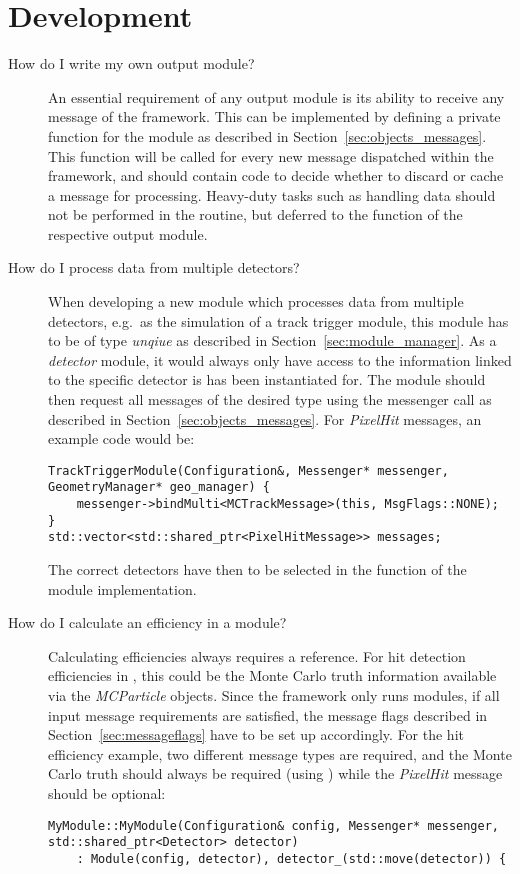 \section{Development}
\begin{description}
\item[How do I write my own output module?]
An essential requirement of any output module is its ability to receive any message of the framework.
This can be implemented by defining a private  function for the module as described in Section~\ref{sec:objects_messages}.
This function will be called for every new message dispatched within the framework, and should contain code to decide whether to discard or cache a message for processing.
Heavy-duty tasks such as handling data should not be performed in the  routine, but deferred to the  function of the respective output module.

\item[How do I process data from multiple detectors?]
When developing a new \apsq module which processes data from multiple detectors, e.g.\ as the simulation of a track trigger module, this module has to be of type \emph{unqiue} as described in Section~\ref{sec:module_manager}.
As a \emph{detector} module, it would always only have access to the information linked to the specific detector is has been instantiated for.
The module should then request all messages of the desired type using the messenger call  as described in Section~\ref{sec:objects_messages}.
For \emph{PixelHit} messages, an example code would be:

\begin{verbatim}
TrackTriggerModule(Configuration&, Messenger* messenger, GeometryManager* geo_manager) {
    messenger->bindMulti<MCTrackMessage>(this, MsgFlags::NONE);
}
std::vector<std::shared_ptr<PixelHitMessage>> messages;
\end{verbatim}
The correct detectors have then to be selected in the  function of the module implementation.
\item[How do I calculate an efficiency in a module?]
Calculating efficiencies always requires a reference.
For hit detection efficiencies in \apsq, this could be the Monte Carlo truth information available via the \emph{MCParticle} objects.
Since the framework only runs modules, if all input message requirements are satisfied, the message flags described in Section~\ref{sec:messageflags} have to be set up accordingly.
For the hit efficiency example, two different message types are required, and the Monte Carlo truth should always be required (using ) while the \emph{PixelHit} message should be optional:
\begin{verbatim}
MyModule::MyModule(Configuration& config, Messenger* messenger, std::shared_ptr<Detector> detector)
    : Module(config, detector), detector_(std::move(detector)) {


\end{verbatim}
\end{description}
